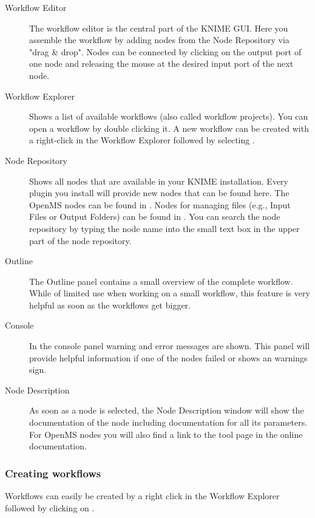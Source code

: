 \begin{description}
\item[Workflow Editor]
The workflow editor is the central part of the KNIME GUI.
Here you assemble the workflow by adding nodes from the Node Repository via "drag \& drop".
Nodes can be connected by clicking on the output port of one node and releasing the mouse at the desired input port of the next node.

\item[Workflow Explorer]
Shows a list of available workflows (also called workflow projects).
You can open a workflow by double clicking it.
A new workflow can be created with a right-click in the Workflow Explorer followed by selecting .

\item[Node Repository]
Shows all nodes that are available in your KNIME installation.
Every plugin you install will provide new nodes that can be found here.
The OpenMS nodes can be found in .
Nodes for managing files (e.g., Input Files or Output Folders) can be found in .
You can search the node repository by typing the node name into the small text box in the upper part of the node repository.

\item[Outline]
The Outline panel contains a small overview of the complete workflow. While of limited use when working on a small workflow, this feature is very helpful as soon as the workflows get bigger.

\item[Console]
In the console panel warning and error messages are shown.
This panel will provide helpful information if one of the nodes failed or shows an warnings sign.

\item[Node Description]
As soon as a node is selected, the Node Description window will show the documentation of the node including documentation for all its parameters.
For OpenMS nodes you will also find a link to the tool page in the online documentation.

\end{description}

\subsubsection{Creating workflows}
\label{sec:create_workflows}

Workflows can easily be created by a right click in the Workflow Explorer followed by clicking on .

